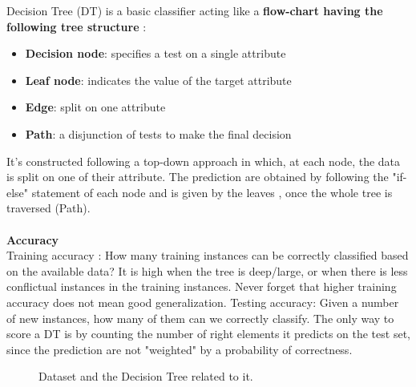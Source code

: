Decision Tree (DT) is a basic classifier acting like a \textbf{flow-chart having the following tree structure}  :
\begin{itemize}
	\item \textbf{Decision node}: specifies a test on a single attribute
	\item \textbf{Leaf node}: indicates the value of the target attribute
	\item \textbf{Edge}: split on one attribute
	\item \textbf{Path}: a disjunction of tests to make the final decision
\end{itemize} 

It's constructed following a top-down approach in which, at each node, the data is split on one of their attribute. The prediction are obtained by following the "if-else" statement of each node and is given by the leaves , once the whole tree is traversed (Path). 
\\\\

\textbf{Accuracy} \\
Training accuracy : How many training instances can be correctly classified based on the available data? It is high when the tree is deep/large, or when there is less conflictual instances in the training instances. Never forget that higher training accuracy does not mean good generalization.
Testing accuracy: Given a number of new instances, how many of them can we correctly classify. The only way to score a DT is by counting the number of right elements it predicts on the test set, since the prediction are not "weighted" by a probability of correctness.

\begin{figure}[H] %
\centerline{
}
\caption{\label{DT} 
Dataset and the Decision Tree related to it.
}
\end{figure}


